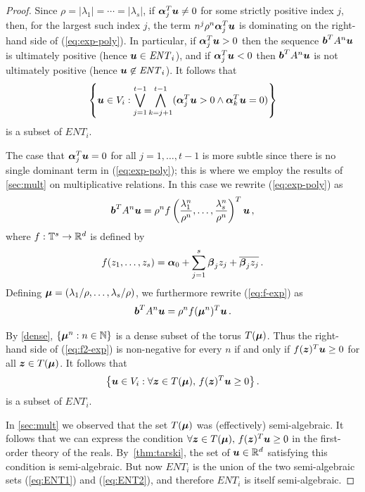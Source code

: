 \begin{proof}
Since $\rho=|\lambda_1|=\cdots=|\lambda_s|$, if
$\boldsymbol{\alpha}_j^T\boldsymbol{u}\neq 0$ for some strictly
positive index $j$, then, for the largest such index $j$, the term
$n^{j}\rho^n\boldsymbol{\alpha}_{j}^T\boldsymbol{u}$ is
dominating on the right-hand side of (\ref{eq:exp-poly}).  In
particular, if $\boldsymbol{\alpha}_{j}^T\boldsymbol{u}>0$ then the
sequence $\boldsymbol{b}^TA^n\boldsymbol{u}$ is ultimately positive
(hence $\boldsymbol{u}\in \mathit{ENT}_i$), and if
$\boldsymbol{\alpha}_{j}^T\boldsymbol{u}<0$ then
$\boldsymbol{b}^TA^n\boldsymbol{u}$ is not ultimately positive (hence
$\boldsymbol{u}\not\in\mathit{ENT}_i$).  It follows that
\begin{gather}
\left\lbrace \myvector{u} \in V_i : \bigvee_{j=1}^{t-1}\bigwedge_{k=j+1}^{t-1}
(\myvector{\alpha}_j^T \myvector{u}>0 \wedge
\myvector{\alpha}_k^T \myvector{u}=0) \right\rbrace
\label{eq:ENT1}
\end{gather}
is a subset of $\mathit{ENT}_i$.

The case that $\boldsymbol{\alpha}_j^T\boldsymbol{u}=0$ for all
$j=1,\ldots,t-1$ is more subtle since there is no single dominant term
in (\ref{eq:exp-poly}); this is where we employ the results of
\cref{sec:mult} on multiplicative relations. In this case we
rewrite (\ref{eq:exp-poly}) as
\begin{gather}
\myvector{b}^T A^n \myvector{u} =
 \rho^n f\left(\frac{\lambda^n_1}{\rho^n},\ldots,
               \frac{\lambda^n_s}{\rho^n}\right)^T \myvector{u} \, ,
\label{eq:f-exp}
\end{gather}
where $f:\mathbb{T}^s\rightarrow\mathbb{R}^{d}$ is defined by
\[f(z_1,\ldots,z_s)=\boldsymbol{\alpha}_0 + \sum_{j=1}^s \boldsymbol{\beta}_jz_j + \overline{\boldsymbol{\beta}_jz_j} \, .\]
Defining $\boldsymbol\mu=(\lambda_1/\rho,\ldots,\lambda_s/\rho)$, we furthermore rewrite (\ref{eq:f-exp}) as
\begin{gather}
\myvector{b}^T A^n \myvector{u} =
    \rho^n f(\myvector\mu^n)^T \myvector{u} \, .
\label{eq:f2-exp}
\end{gather}

By \cref{dense}, $\lbrace \boldsymbol\mu^n : n \in
\mathbb{N} \rbrace$ is a dense subset of the torus $T(\boldsymbol{\mu})$.
Thus the right-hand side of (\ref{eq:f2-exp}) is non-negative for
every $n$ if and only if $f(\boldsymbol{z})^T\boldsymbol{u}\geq 0$ for
all $\boldsymbol{z}\in T(\boldsymbol{\mu})$.  It follows that
\begin{gather} \big \lbrace \myvector{u}\in V_i :
\forall \myvector{z}\in T(\myvector{\mu}),\,
                              f(\myvector{z})^T\myvector{u}\geq 0
\big\rbrace\, .
\label{eq:ENT2}
\end{gather}
is a subset of $\mathit{ENT}_i$.

In \cref{sec:mult} we observed that the set
$T(\boldsymbol{\mu})$ was (effectively) semi-algebraic.  It follows
that we can express the condition $\forall \boldsymbol{z}\in
T(\boldsymbol{\mu}),\, f(\boldsymbol{z})^T\boldsymbol{u}\geq 0$ in the
first-order theory of the reals.
By~\cref{thm:tarski}, the set of $\boldsymbol{u}\in
\mathbb{R}^{d}$ satisfying this condition is semi-algebraic.  But now
$\mathit{ENT}_i$ is the union of the two semi-algebraic sets
(\ref{eq:ENT1}) and (\ref{eq:ENT2}), and therefore $\mathit{ENT}_i$ is
itself semi-algebraic.
\end{proof}
